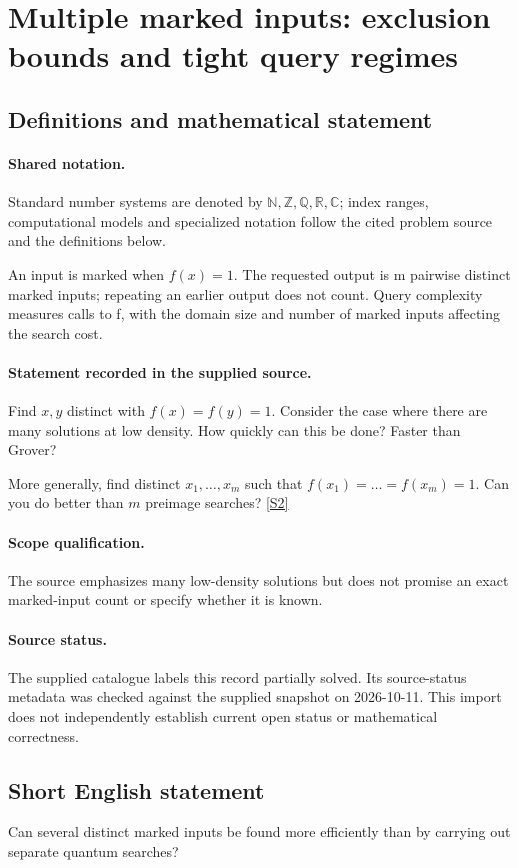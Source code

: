 \documentclass[11pt]{article}
\newcommand{\sref}[2]{\hyperlink{source:#1:#2}{[S#2]}}
\begin{document}
\section{Multiple marked inputs: exclusion bounds and tight query regimes}\label{statement}

\subsection{Definitions and mathematical statement}

\paragraph{Shared notation.}Standard number systems are denoted by $\mathbb N,\mathbb Z,\mathbb Q,\mathbb R,\mathbb C$; index ranges, computational models and specialized notation follow the cited problem source and the definitions below.


An input is marked when $f(x)=1$. The requested output is m pairwise distinct marked inputs; repeating an earlier output does not count. Query complexity measures calls to f, with the domain size and number of marked inputs affecting the search cost.
\paragraph{Statement recorded in the supplied source.}
Find $x,y$ distinct with $f(x) = f(y) = 1$. Consider the case where there are many solutions at low density. How quickly can this be done? Faster than Grover?

More generally, find distinct $x_1,\dots, x_m$ such that $f(x_1) = \dots = f(x_m) = 1$. Can you do better than $m$ preimage searches? \sref{statement}{2}
\paragraph{Scope qualification.}
The source emphasizes many low-density solutions but does not promise an exact marked-input count or specify whether it is known.
\paragraph{Source status.}
The supplied catalogue labels this record partially solved. Its source-status metadata was checked against the supplied snapshot on 2026-10-11. This import does not independently establish current open status or mathematical correctness.
\subsection{Short English statement}
Can several distinct marked inputs be found more efficiently than by carrying out separate quantum searches?
\end{document}
